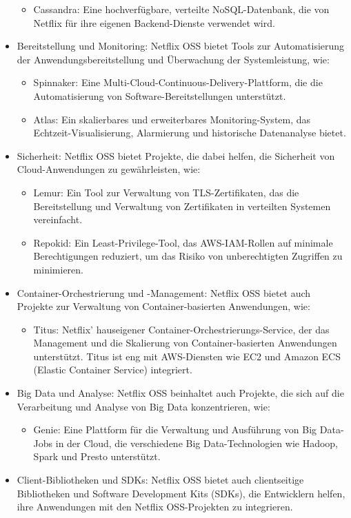 \begin{itemize}
\begin{itemize}
\item Cassandra: Eine hochverfügbare, verteilte NoSQL-Datenbank, die von Netflix für ihre eigenen Backend-Dienste verwendet wird.
\end{itemize}
\item Bereitstellung und Monitoring: Netflix OSS bietet Tools zur Automatisierung der Anwendungsbereitstellung und Überwachung der Systemleistung, wie:
\begin{itemize}
\item Spinnaker: Eine Multi-Cloud-Continuous-Delivery-Plattform, die die Automatisierung von Software-Bereitstellungen unterstützt.
\item Atlas: Ein skalierbares und erweiterbares Monitoring-System, das Echtzeit-Visualisierung, Alarmierung und historische Datenanalyse bietet.
\end{itemize}
\item Sicherheit: Netflix OSS bietet Projekte, die dabei helfen, die Sicherheit von Cloud-Anwendungen zu gewährleisten, wie:
\begin{itemize}
\item Lemur: Ein Tool zur Verwaltung von TLS-Zertifikaten, das die Bereitstellung und Verwaltung von Zertifikaten in verteilten Systemen vereinfacht.
\item Repokid: Ein Least-Privilege-Tool, das AWS-IAM-Rollen auf minimale Berechtigungen reduziert, um das Risiko von unberechtigten Zugriffen zu minimieren.
\end{itemize}
\item Container-Orchestrierung und -Management: Netflix OSS bietet auch Projekte zur Verwaltung von Container-basierten Anwendungen, wie:
\begin{itemize}
\item Titus: Netflix' hauseigener Container-Orchestrierungs-Service, der das Management und die Skalierung von Container-basierten Anwendungen unterstützt. Titus ist eng mit AWS-Diensten wie EC2 und Amazon ECS (Elastic Container Service) integriert.
\end{itemize}
\item Big Data und Analyse: Netflix OSS beinhaltet auch Projekte, die sich auf die Verarbeitung und Analyse von Big Data konzentrieren, wie:
\begin{itemize}
\item Genie: Eine Plattform für die Verwaltung und Ausführung von Big Data-Jobs in der Cloud, die verschiedene Big Data-Technologien wie Hadoop, Spark und Presto unterstützt.
\end{itemize}
\item Client-Bibliotheken und SDKs: Netflix OSS bietet auch clientseitige Bibliotheken und Software Development Kits (SDKs), die Entwicklern helfen, ihre Anwendungen mit den Netflix OSS-Projekten zu integrieren.
\end{itemize}
